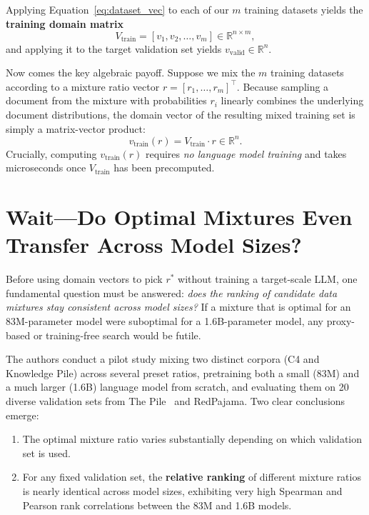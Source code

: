 \documentclass[12pt]{article}
\begin{document}
Applying Equation~\eqref{eq:dataset_vec} to each of our $m$ training datasets yields the \textbf{training domain matrix}
\[
V_{\text{train}} = [v_1, v_2, \dots, v_m] \in \mathbb{R}^{n \times m},
\]
and applying it to the target validation set yields $v_{\text{valid}} \in \mathbb{R}^n$.

Now comes the key algebraic payoff. Suppose we mix the $m$ training datasets according to a mixture ratio vector $r = [r_1, \dots, r_m]^\top$. Because sampling a document from the mixture with probabilities $r_i$ linearly combines the underlying document distributions, the domain vector of the resulting mixed training set is simply a matrix-vector product:
\begin{equation}
v_{\text{train}}(r) = V_{\text{train}} \cdot r \in \mathbb{R}^n.
\label{eq:linear_mix}
\end{equation}
Crucially, computing $v_{\text{train}}(r)$ requires \emph{no language model training} and takes microseconds once $V_{\text{train}}$ has been precomputed.

\section*{Wait—Do Optimal Mixtures Even Transfer Across Model Sizes?}

Before using domain vectors to pick $r^*$ without training a target-scale LLM, one fundamental question must be answered: \emph{does the ranking of candidate data mixtures stay consistent across model sizes?} If a mixture that is optimal for an 83M-parameter model were suboptimal for a 1.6B-parameter model, any proxy-based or training-free search would be futile.

The authors conduct a pilot study mixing two distinct corpora (C4 and Knowledge Pile) across several preset ratios, pretraining both a small (83M) and a much larger (1.6B) language model from scratch, and evaluating them on 20 diverse validation sets from The Pile~\cite{gao2021pile} and RedPajama. Two clear conclusions emerge:
\begin{enumerate}
    \item The optimal mixture ratio varies substantially depending on which validation set is used.
    \item For any fixed validation set, the \textbf{relative ranking} of different mixture ratios is nearly identical across model sizes, exhibiting very high Spearman and Pearson rank correlations between the 83M and 1.6B models.
\end{enumerate}
\end{document}
